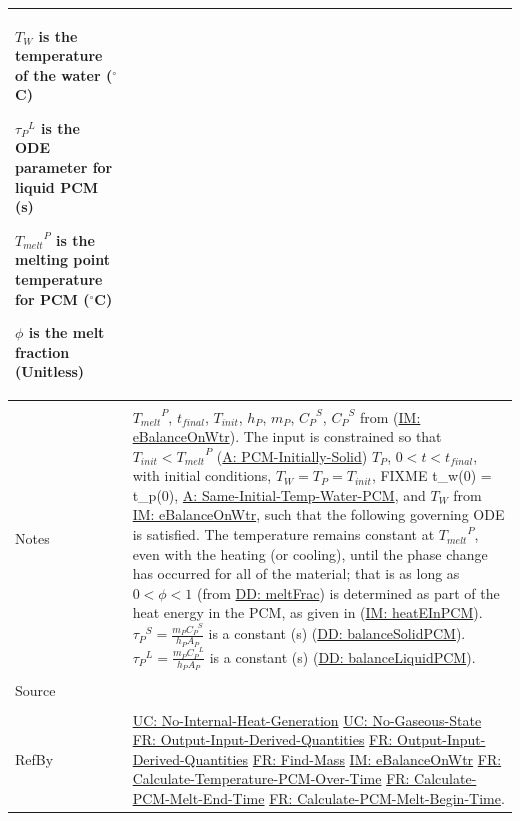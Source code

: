 \documentclass[12pt]{article}
\begin{document}
\begin{minipage}{\textwidth}
\begin{tabular}{p{} p{}}
\begin{symbDescription}
              \item{${T_{W}}$ is the temperature of the water (${}^{\circ}$C)}
              \item{${{τ_{P}}^{L}}$ is the ODE parameter for liquid PCM (s)}
              \item{${{T_{melt}}^{P}}$ is the melting point temperature for PCM (${}^{\circ}$C)}
              \item{$ϕ$ is the melt fraction (Unitless)}
              \end{symbDescription}
\\ \midrule \\
Notes & ${{T_{melt}}^{P}}$, ${t_{final}}$, ${T_{init}}$, ${h_{P}}$, ${m_{P}}$, ${{C_{P}}^{S}}$, ${{C_{P}}^{S}}$ from (\hyperref[IM:eBalanceOnWtr]{IM: eBalanceOnWtr}). The input is constrained so that ${T_{init}}<{{T_{melt}}^{P}}$ (\hyperref[assumpPIS]{A: PCM-Initially-Solid}) ${T_{P}}$, $0<t<{t_{final}}$, with initial conditions, ${T_{W}}={T_{P}}={T_{init}}$, FIXME t\_w(0) = t\_p(0), \hyperref[assumpSITWP]{A: Same-Initial-Temp-Water-PCM}, and ${T_{W}}$ from \hyperref[IM:eBalanceOnWtr]{IM: eBalanceOnWtr}, such that the following governing ODE is satisfied. The temperature remains constant at ${{T_{melt}}^{P}}$, even with the heating (or cooling), until the phase change has occurred for all of the material; that is as long as $0<ϕ<1$ (from \hyperref[DD:meltFrac]{DD: meltFrac}) is determined as part of the heat energy in the PCM, as given in (\hyperref[IM:heatEInPCM]{IM: heatEInPCM}). ${{τ_{P}}^{S}}=\frac{{m_{P}} {{C_{P}}^{S}}}{{h_{P}} {A_{P}}}$ is a constant (s) (\hyperref[DD:balanceSolidPCM]{DD: balanceSolidPCM}). ${{τ_{P}}^{L}}=\frac{{m_{P}} {{C_{P}}^{L}}}{{h_{P}} {A_{P}}}$ is a constant (s) (\hyperref[DD:balanceLiquidPCM]{DD: balanceLiquidPCM}).
\\ \midrule \\
Source & \cite{koothoor2013}
\\ \midrule \\
RefBy & \hyperref[unlikeChgNIHG]{UC: No-Internal-Heat-Generation} \hyperref[unlikeChgNGS]{UC: No-Gaseous-State} \hyperref[outputInputDerivQuants]{FR: Output-Input-Derived-Quantities} \hyperref[outputInputDerivQuants]{FR: Output-Input-Derived-Quantities} \hyperref[findMass]{FR: Find-Mass} \hyperref[IM:eBalanceOnWtr]{IM: eBalanceOnWtr} \hyperref[calcTempPCMOverTime]{FR: Calculate-Temperature-PCM-Over-Time} \hyperref[calcPCMMeltEnd]{FR: Calculate-PCM-Melt-End-Time} \hyperref[calcPCMMeltBegin]{FR: Calculate-PCM-Melt-Begin-Time}.
\\ \bottomrule \end{tabular}
\end{minipage}
\end{document}
